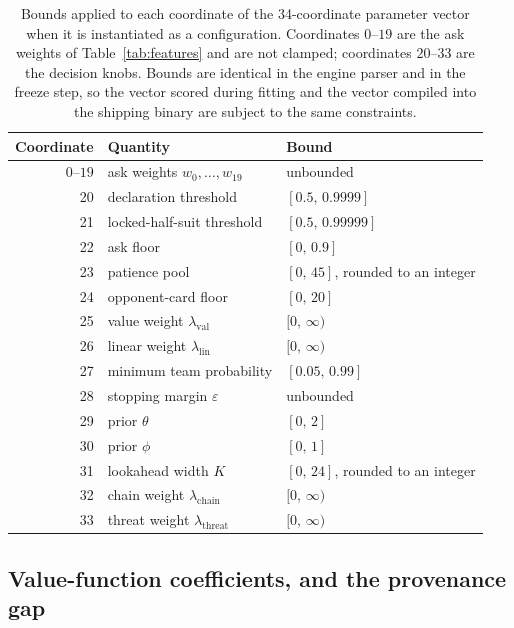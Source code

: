 \documentclass[11pt]{article}
\theoremstyle{definition}
\newcommand{\numParams}{34}
\begin{document}
\begin{table}[ht]
\centering
\caption{Bounds applied to each coordinate of the \numParams{}-coordinate
parameter vector when it is instantiated as a configuration. Coordinates
$0$--$19$ are the ask weights of Table~\ref{tab:features} and are not clamped;
coordinates $20$--$33$ are the decision knobs. Bounds are identical in the engine
parser and in the freeze step, so the vector scored during fitting and the vector
compiled into the shipping binary are subject to the same constraints.}
\label{tab:bounds}
\small
\begin{tabular}{rll}
\toprule
Coordinate & Quantity & Bound \\
\midrule
$0$--$19$ & ask weights $w_0,\dots,w_{19}$ & unbounded \\
20 & declaration threshold & $[0.5,\,0.9999]$ \\
21 & locked-half-suit threshold & $[0.5,\,0.99999]$ \\
22 & ask floor & $[0,\,0.9]$ \\
23 & patience pool & $[0,\,45]$, rounded to an integer \\
24 & opponent-card floor & $[0,\,20]$ \\
25 & value weight $\lambda_{\mathrm{val}}$ & $[0,\,\infty)$ \\
26 & linear weight $\lambda_{\mathrm{lin}}$ & $[0,\,\infty)$ \\
27 & minimum team probability & $[0.05,\,0.99]$ \\
28 & stopping margin $\varepsilon$ & unbounded \\
29 & prior $\theta$ & $[0,\,2]$ \\
30 & prior $\phi$ & $[0,\,1]$ \\
31 & lookahead width $K$ & $[0,\,24]$, rounded to an integer \\
32 & chain weight $\lambda_{\mathrm{chain}}$ & $[0,\,\infty)$ \\
33 & threat weight $\lambda_{\mathrm{threat}}$ & $[0,\,\infty)$ \\
\bottomrule
\end{tabular}
\end{table}

\subsection{Value-function coefficients, and the provenance gap}
\end{document}

